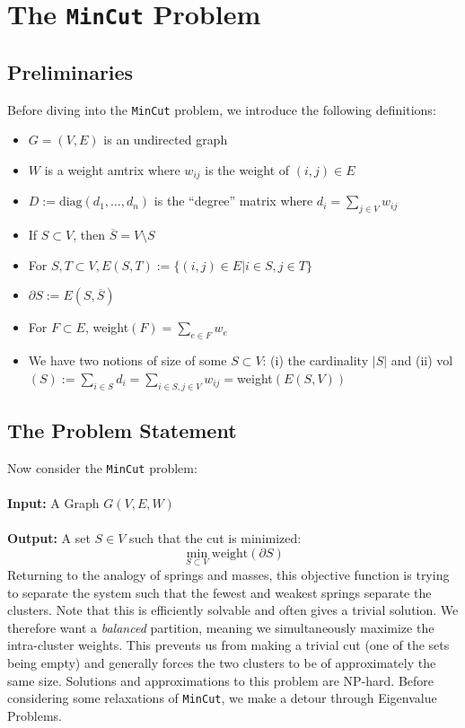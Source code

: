 \section{The \texttt{MinCut} Problem}
\subsection{Preliminaries}
Before diving into the \texttt{MinCut} problem, we introduce the following definitions:
\begin{itemize}
\item \(G=(V,E)\) is an undirected graph
\item \(W\) is a weight amtrix where \(w_{ij}\) is the weight of \((i,j)\in E\) 
\item \(D:=\text{diag}(d_1,\ldots,d_n)\) is the ``degree'' matrix where \(d_i=\sum_{j\in V}w_{ij}\)
\item If \(S\subset V\), then \(\overline{S}=V\setminus S\)
\item For \(S,T\subset V, E(S,T):=\{(i,j)\in E | i\in S, j\in T \} \)
\item \(\partial S:=E(S,\overline{S})\)
\item For \(F\subset E\), weight\((F)=\sum_{e\in F}w_e\)
\item We have two notions of size of some \(S\subset V\): (i) the cardinality \(|S|\) and (ii) vol\((S):=\sum_{i\in S}d_i=\sum_{i\in S,j\in V}w_{ij}=\)weight\((E(S,V))\)
\end{itemize}
\subsection{The Problem Statement}
Now consider the \texttt{MinCut} problem: 
\\\\
\noindent
\textbf{Input:} A Graph \(G(V, E, W)\)
\\\\
\noindent
\textbf{Output:} A set \(S\in V\) such that the cut is minimized: 
\[
\min_{S\subset V}\text{weight}(\partial S) 
\]
Returning to the analogy of springs and masses, this objective function is trying to separate the system such that the fewest and weakest springs separate the clusters. Note that this is efficiently solvable and often gives a trivial solution. We therefore want a \textit{balanced} partition, meaning we simultaneously maximize the intra-cluster weights. This prevents us from making a trivial cut (one of the sets being empty) and generally forces the two clusters to be of approximately the same size. Solutions and approximations to this problem are NP-hard. Before considering some relaxations of \texttt{MinCut}, we make a detour through Eigenvalue Problems.

